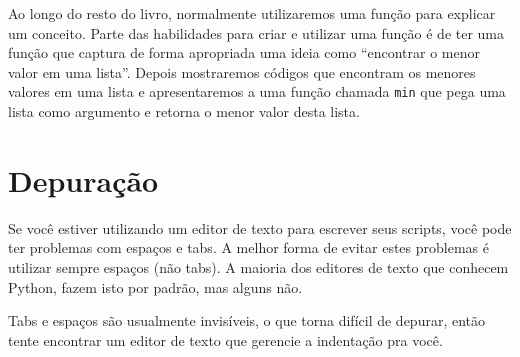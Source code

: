 
Ao longo do resto do livro, normalmente utilizaremos uma função para explicar
um conceito. Parte das habilidades para criar e utilizar uma função é de ter
uma função que captura de forma apropriada uma ideia como ``encontrar o menor
valor em uma lista''. Depois mostraremos códigos que encontram os menores
valores em uma lista e apresentaremos a uma função chamada {\tt min} que
pega uma lista como argumento e retorna o menor valor desta lista.


\section{Depuração}
\label{editor}


Se você estiver utilizando um editor de texto para escrever seus scripts,
você pode ter problemas com espaços e tabs. A melhor forma de evitar estes
problemas é utilizar sempre espaços (não tabs). A maioria dos editores de
texto que conhecem Python, fazem isto por padrão, mas alguns não.



Tabs e espaços são usualmente invisíveis, o que torna difícil de depurar,
então tente encontrar um editor de texto que gerencie a indentação pra
você.


